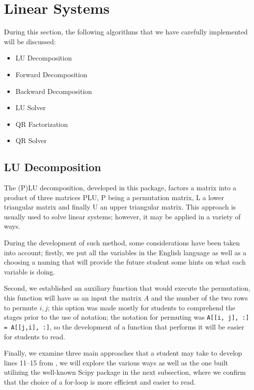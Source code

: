 \section{Linear Systems}
During this section, the following algorithms that we have carefully implemented will be discussed:
\begin{itemize}
    \item LU Decomposition  
    \item Forward Decomposition 
    \item Backward Decomposition 
    \item LU Solver 
    \item QR Factorization 
    \item QR Solver 
\end{itemize}

\subsection{LU Decomposition}
The (P)LU decomposition, developed in this package, factors a matrix into a product of three matrices PLU, P being a permutation matrix, L a lower triangular matrix and finally U an upper triangular matrix. This approach is usually used to solve linear systems; however, it may be applied in a variety of ways.

During the development of such method, some considerations have been taken into account; firstly, we put all the variables in the English language as well as a choosing a naming that will provide the future student some hints on what each variable is doing. 

Second, we established an auxiliary function that would execute the permutation, this function will have as an input the matrix $A$ and the number of the two rows to permute $i,j$; this option was made mostly for students to comprehend the stages prior to the use of notation; the notation for permuting was \lstinline|A[[i, j], :] = A[[j,i], :]|, so the development of a function that performs it will be easier for students to read.

Finally, we examine three main approaches that a student may take to develop lines 11–15 from , we will explore the various ways as well as the one built utilizing the well-known Scipy package in the next subsection, where we confirm that the choice of a for-loop is more efficient and easier to read.

